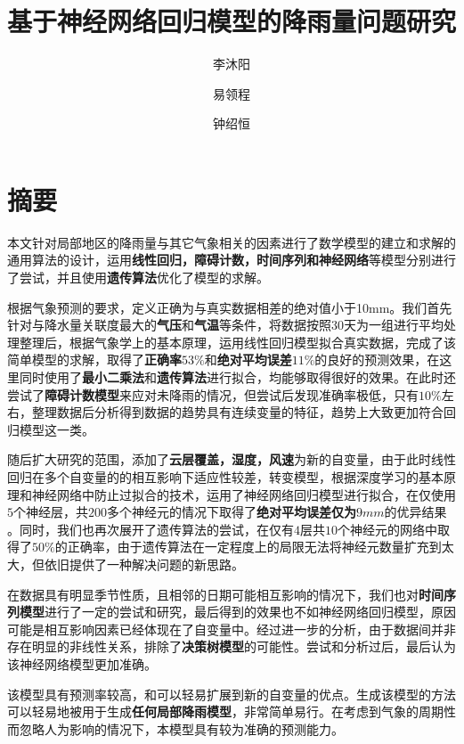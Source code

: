 \documentclass[UTF8, a4paper]{ctexart}
\title{基于神经网络回归模型的降雨量问题研究}
\author{李沐阳 \and 易领程 \and 钟绍恒}
\begin{document}
\maketitle

\newpage

\tableofcontents


\newpage

\section{摘要}

本文针对局部地区的降雨量与其它气象相关的因素进行了数学模型的建立和求解的通用算法的设计，运用\textbf{线性回归，障碍计数，时间序列和神经网络}等模型分别进行了尝试，并且使用\textbf{遗传算法}优化了模型的求解。

根据气象预测的要求，定义正确为与真实数据相差的绝对值小于10mm。我们首先针对与降水量关联度最大的\textbf{气压}和\textbf{气温}等条件，将数据按照$30$天为一组进行平均处理整理后，根据气象学上的基本原理，运用线性回归模型拟合真实数据，完成了该简单模型的求解，取得了\textbf{正确率$53 \%$}和\textbf{绝对平均误差$11\%$}的良好的预测效果，在这里同时使用了\textbf{最小二乘法}和\textbf{遗传算法}进行拟合，均能够取得很好的效果。在此时还尝试了\textbf{障碍计数模型}来应对未降雨的情况，但尝试后发现准确率极低，只有$10\%$左右，整理数据后分析得到数据的趋势具有连续变量的特征，趋势上大致更加符合回归模型这一类。

随后扩大研究的范围，添加了\textbf{云层覆盖，湿度，风速}为新的自变量，由于此时线性回归在多个自变量的的相互影响下适应性较差，转变模型，根据深度学习的基本原理和神经网络中防止过拟合的技术，运用了神经网络回归模型进行拟合，在仅使用$5$个神经层，共$200$多个神经元的情况下取得了\textbf{绝对平均误差仅为$9mm$}的优异结果 。同时，我们也再次展开了遗传算法的尝试，在仅有$4$层共$10$个神经元的网络中取得了$50\%$的正确率，由于遗传算法在一定程度上的局限无法将神经元数量扩充到太大，但依旧提供了一种解决问题的新思路。

在数据具有明显季节性质，且相邻的日期可能相互影响的情况下，我们也对\textbf{时间序列模型}进行了一定的尝试和研究，最后得到的效果也不如神经网络回归模型，原因可能是相互影响因素已经体现在了自变量中。经过进一步的分析，由于数据间并非存在明显的非线性关系，排除了\textbf{决策树模型}的可能性。尝试和分析过后，最后认为该神经网络模型更加准确。

该模型具有预测率较高，和可以轻易扩展到新的自变量的优点。生成该模型的方法可以轻易地被用于生成\textbf{任何局部降雨模型}，非常简单易行。在考虑到气象的周期性而忽略人为影响的情况下，本模型具有较为准确的预测能力。
\end{document}
